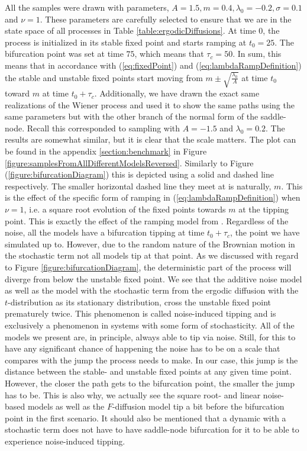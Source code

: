 All the samples were drawn with parameters, $A = 1.5, m = 0.4, \lambda_0 = -0.2, \sigma = 0.1$ and $\nu = 1$. These parameters are carefully selected to ensure that we are in the state space of all processes in Table \ref{table:ergodicDiffusions}. At time $0$, the process is initialized in its stable fixed point and starts ramping at $t_0 = 25$. The bifurcation point was set at time $75$, which means that $\tau_c = 50$. In sum, this means that in accordance with (\ref{eq:fixedPoint}) and (\ref{eq:lambdaRampDefinition}) the stable and unstable fixed points start moving from $m\pm\sqrt{\frac{\lambda_0}{A}}$ at time $t_0$ toward $m$ at time $t_0 + \tau_c$. Additionally, we have drawn the exact same realizations of the Wiener process and used it to show the same paths using the same parameters but with the other branch of the normal form of the saddle-node. Recall this corresponded to sampling with $A = -1.5$ and $\lambda_0 = 0.2$. The results are somewhat similar, but it is clear that the scale matters. The plot can be found in the appendix \ref{section:benchmark} in Figure \ref{figure:samplesFromAllDifferentModelsReversed}. Similarly to Figure (\ref{figure:bifurcationDiagram}) this is depicted using a solid and dashed line respectively. The smaller horizontal dashed line they meet at is naturally, $m$. This is the effect of the specific form of ramping in (\ref{eq:lambdaRampDefinition}) when $\nu = 1$, i.e. a square root evolution of the fixed points towards $m$ at the tipping point. This is exactly the effect of the ramping model from \cite{Ditlevsen2023}. Regardless of the noise, all the models have a bifurcation tipping at time $t_0+\tau_c$, the point we have simulated up to. However, due to the random nature of the Brownian motion in the stochastic term not all models tip at that point. As we discussed with regard to Figure \ref{figure:bifurcationDiagram}, the deterministic part of the process will diverge from below the unstable fixed point. We see that the additive noise model as well as the model with the stochastic term from the ergodic diffusion with the $t$-distribution as its stationary distribution, cross the unstable fixed point prematurely twice. This phenomenon is called noise-induced tipping and is exclusively a phenomenon in systems with some form of stochasticity. All of the models we present are, in principle, always able to tip via noise. Still, for this to have any significant chance of happening the noise has to be on a scale that compares with the jump the process needs to make. In our case, this jump is the distance between the stable- and unstable fixed points at any given time point. However, the closer the path gets to the bifurcation point, the smaller the jump has to be. This is also why, we actually see the square root- and linear noise-based models as well as the $F$-diffusion model tip a bit before the bifurcation point in the first scenario. It should also be mentioned that a dynamic with a stochastic term does not have to have saddle-node bifurcation for it to be able to experience noise-induced tipping.

